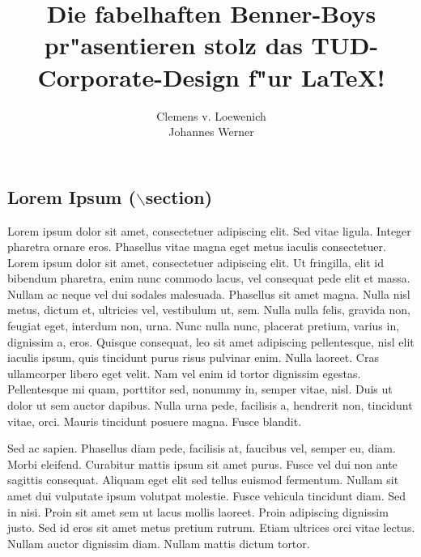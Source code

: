 \documentclass[colorbacktitle,accentcolor=tud9c]{tudposter}
\title{Die fabelhaften Benner-Boys pr"asentieren
  stolz das TUD-Corporate-Design f"ur {\LaTeX}!}
\subtitle{Clemens v. Loewenich\\Johannes Werner}
\begin{document}
 \maketitle\vfill
 \begin{multicols}{3}
   \section*{Lorem Ipsum ($\backslash$section)}

    Lorem ipsum dolor sit amet, consectetuer adipiscing elit. Sed vitae ligula. Integer pharetra ornare eros. Phasellus vitae magna eget metus iaculis consectetuer. Lorem ipsum dolor sit amet, consectetuer adipiscing elit. Ut fringilla, elit id bibendum pharetra, enim nunc commodo lacus, vel consequat pede elit et massa. Nullam ac neque vel dui sodales malesuada. Phasellus sit amet magna. Nulla nisl metus, dictum et, ultricies vel, vestibulum ut, sem. Nulla nulla felis, gravida non, feugiat eget, interdum non, urna. Nunc nulla nunc, placerat pretium, varius in, dignissim a, eros. Quisque consequat, leo sit amet adipiscing pellentesque, nisl elit iaculis ipsum, quis tincidunt purus risus pulvinar enim. Nulla laoreet. Cras ullamcorper libero eget velit. Nam vel enim id tortor dignissim egestas. Pellentesque mi quam, porttitor sed, nonummy in, semper vitae, nisl. Duis ut dolor ut sem auctor dapibus. Nulla urna pede, facilisis a, hendrerit non, tincidunt vitae, orci. Mauris tincidunt posuere magna. Fusce blandit.

    Sed ac sapien. Phasellus diam pede, facilisis at, faucibus vel, semper eu, diam. Morbi eleifend. Curabitur mattis ipsum sit amet purus. Fusce vel dui non ante sagittis consequat. Aliquam eget elit sed tellus euismod fermentum. Nullam sit amet dui vulputate ipsum volutpat molestie. Fusce vehicula tincidunt diam. Sed in nisi. Proin sit amet sem ut lacus mollis laoreet. Proin adipiscing dignissim justo. Sed id eros sit amet metus pretium rutrum. Etiam ultrices orci vitae lectus. Nullam auctor dignissim diam. Nullam mattis dictum tortor.


\end{multicols}
\end{document}
